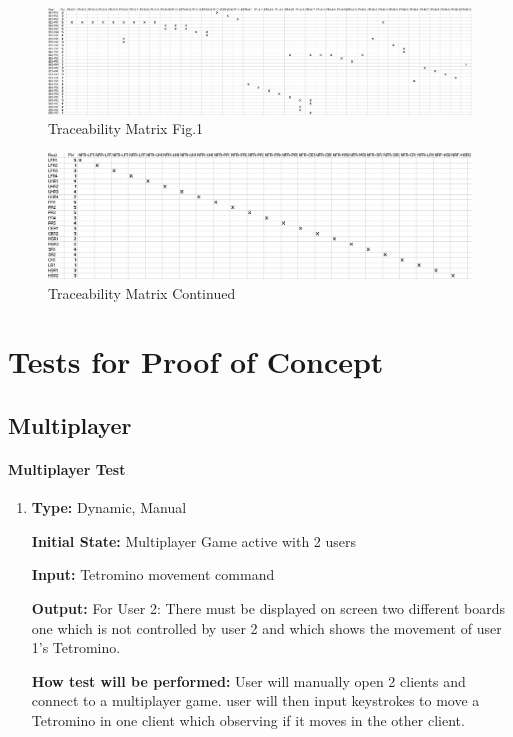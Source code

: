 \documentclass[12pt, titlepage]{article}
\begin{document}
	
	\begin{figure}[H]
		\centering
		\includegraphics[width=1.2\textwidth]{TESTPLAN/traceabilitymatrix1.png}
		\caption{Traceability Matrix Fig.1}
		\label{fig:tm1}
	\end{figure}
	
	
	\begin{figure}[H]
		\centering
		\includegraphics[width=1.2\textwidth]{TESTPLAN/traceabilitymatrix2.png} 
		\caption{Traceability Matrix Continued}
		\label{fig:tm2}
	\end{figure}
	
	
	\section{Tests for Proof of Concept}
	
	\subsection{Multiplayer}
	
	\paragraph{Multiplayer Test}
	
	\begin{enumerate}[{POC-}1. ]
		
		\item
		
		\textbf{Type:} Dynamic, Manual
		
		\textbf{Initial State:} Multiplayer Game active with 2 users
		
		\textbf{Input:} Tetromino movement command
		
		\textbf{Output:} For User 2: There must be displayed on screen two different boards one which is not controlled by user 2 and which shows the movement of user 1's Tetromino.
		
		\textbf{How test will be performed:} User will manually open 2 clients and connect to a multiplayer game. user will then input keystrokes to move a Tetromino in one client which observing if it moves in the other client.
		
	\end{enumerate}
	
\end{document}
